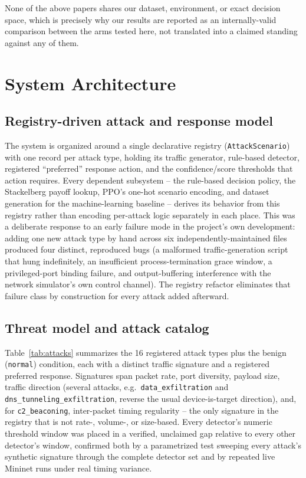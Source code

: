 \documentclass[conference]{IEEEtran}
\begin{document}
None of the above papers shares our dataset, environment, or exact decision space, which is
precisely why our results are reported as an internally-valid comparison between the arms tested
here, not translated into a claimed standing against any of them.

\section{System Architecture}

\subsection{Registry-driven attack and response model}

The system is organized around a single declarative registry
(\texttt{AttackScenario}) with one record per attack type, holding its traffic generator,
rule-based detector, registered ``preferred'' response action, and the confidence/score thresholds
that action requires. Every dependent subsystem -- the rule-based decision policy, the Stackelberg
payoff lookup, PPO's one-hot scenario encoding, and dataset generation for the machine-learning
baseline -- derives its behavior from this registry rather than encoding per-attack logic
separately in each place. This was a deliberate response to an early failure mode in the project's
own development: adding one new attack type by hand across six independently-maintained files
produced four distinct, reproduced bugs (a malformed traffic-generation script that hung
indefinitely, an insufficient process-termination grace window, a privileged-port binding failure,
and output-buffering interference with the network simulator's own control channel). The registry
refactor eliminates that failure class by construction for every attack added afterward.

\subsection{Threat model and attack catalog}

Table~\ref{tab:attacks} summarizes the 16 registered attack types plus the benign (\texttt{normal})
condition, each with a distinct traffic signature and a registered preferred response. Signatures
span packet rate, port diversity, payload size, traffic direction (several attacks, e.g.\
\texttt{data\_exfiltration} and \texttt{dns\_tunneling\_exfiltration}, reverse the usual
device-is-target direction), and, for \texttt{c2\_beaconing}, inter-packet timing regularity --
the only signature in the registry that is not rate-, volume-, or size-based. Every detector's
numeric threshold window was placed in a verified, unclaimed gap relative to every other
detector's window, confirmed both by a parametrized test sweeping every attack's synthetic
signature through the complete detector set and by repeated live Mininet runs under real timing
variance.
\end{document}
